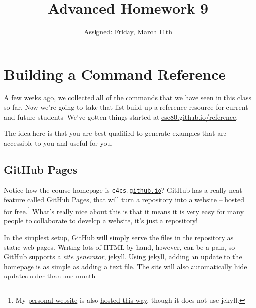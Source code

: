 \documentclass{article}
\begin{document}
\fancyfoot[C]{\color{gray} \thepage~/~\pageref*{LastPage}}
\pagestyle{fancyplain}


\title{\textbf{Advanced Homework 9\\}}
\author{Assigned: Friday, March 11th}
\date{\textbf{\color{red}{Due: Before the first lecture on Friday, March 25}}}
\maketitle



\section*{Building a Command Reference}

A few weeks ago, we collected all of the commands that we have seen in this
class so far. Now we're going to take that list build up a reference resource
for current and future students. We've gotten things started at
\href{https://cse80.github.io/reference}{cse80.github.io/reference}.

The idea here is that you are best qualified to generate examples that are
accessible to you and useful for you.

\subsection*{GitHub Pages}

Notice how the course homepage is \texttt{c4cs.\ul{github.io}}? GitHub has a
really neat feature called \href{https://pages.github.com/}{GitHub Pages},
that will turn a repository into a website -- hosted for free.\footnote{
  My \href{https://github.com/ppannuto/patpannuto.com}{personal website} is also
  \href{https://github.com/ppannuto/ppannuto.github.io}{hosted this way},
  though it does not use jekyll.
} What's really nice about this is that it means it is very easy for many
people to collaborate to develop a website, it's just a repository!

In the simplest setup, GitHub will simply serve the files in the repository as
static web pages. Writing lots of HTML by hand, however, can be a pain, so
GitHub supports a \emph{site generator}, \href{https://jekyllrb.com/}{jekyll}.
Using jekyll, adding an update to the homepage is as simple as adding
\href{https://github.com/cse80/cse80.github.io/blob/master/updates/_posts/2016-02-27-spring-break-advanced.md}{a text file}.
The site will also
\href{https://github.com/cse80/cse80.github.io/blob/master/index.html#L32}%
{automatically hide updates older than one month}.
\end{document}
